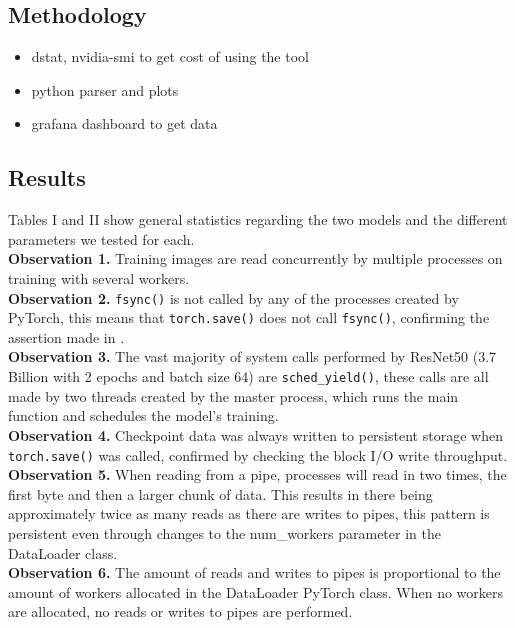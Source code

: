\documentclass[conference]{IEEEtran}
\begin{document}
\subsection{Methodology}

\begin{itemize}
	\item dstat, nvidia-smi to get cost of using the tool
	\item python parser and plots
	\item grafana dashboard to get data
\end{itemize}

\subsection{Results}

Tables I and II show general statistics regarding the two models and the different parameters we tested for each.
\\
\textbf{Observation 1.} Training images are read concurrently by multiple processes on training with several workers.
\\
\textbf{Observation 2.} \texttt{fsync()} is not called by any of the processes created by PyTorch, this means that \texttt{torch.save()} does not call \texttt{fsync()}, confirming the assertion made in \cite{checkfreq}.
\\
\textbf{Observation 3.} The vast majority of system calls performed by ResNet50 (3.7 Billion with 2 epochs and batch size 64) are \texttt{sched\_yield()}, these calls are all made by two threads created by the master process, which runs the main function and schedules the model's training.
\\
\textbf{Observation 4.} Checkpoint data was always written to persistent storage when \texttt{torch.save()} was called, confirmed by checking the block I/O write throughput.
\\
\textbf{Observation 5.} When reading from a pipe, processes will read in two times, the first byte and then a larger chunk of data. This results in there being approximately twice as many reads as there are writes to pipes, this pattern is persistent even through changes to the num\_workers parameter in the DataLoader class.
\\
\textbf{Observation 6.} The amount of reads and writes to pipes is proportional to the amount of workers allocated in the DataLoader PyTorch class. When no workers are allocated, no reads or writes to pipes are performed.
\\
\end{document}
